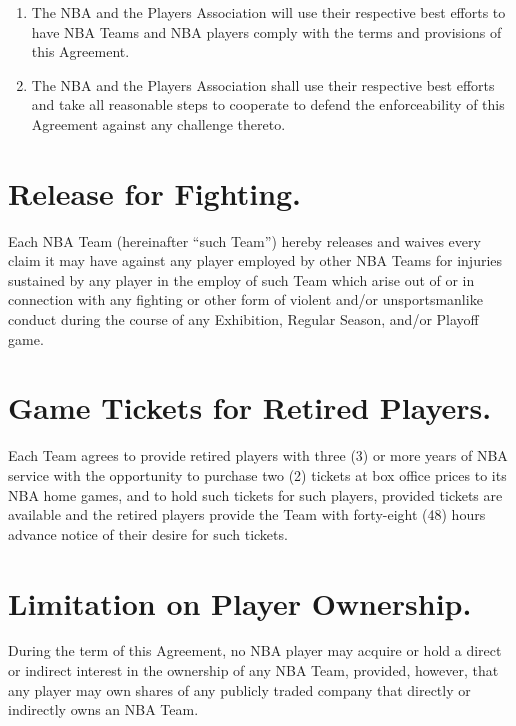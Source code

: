 \documentclass[
]{book}
\providecommand{\tightlist}{%
  \setlength{\itemsep}{0pt}\setlength{\parskip}{0pt}}
\begin{document}
\begin{enumerate}
\def\labelenumi{(\alph{enumi})}
\tightlist
\item
  The NBA and the Players Association will use their respective best efforts to have NBA Teams and NBA players comply with the terms and provisions of this Agreement.
\item
  The NBA and the Players Association shall use their respective best efforts and take all reasonable steps to cooperate to defend the enforceability of this Agreement against any challenge thereto.
\end{enumerate}

\hypertarget{release-for-fighting.}{%
\section{Release for Fighting.}\label{release-for-fighting.}}

Each NBA Team (hereinafter ``such Team'') hereby releases and waives every claim it may have against any player employed by other NBA Teams for injuries sustained by any player in the employ of such Team which arise out of or in connection with any fighting or other form of violent and/or unsportsmanlike conduct during the course of any Exhibition, Regular Season, and/or Playoff game.

\hypertarget{game-tickets-for-retired-players.}{%
\section{Game Tickets for Retired Players.}\label{game-tickets-for-retired-players.}}

Each Team agrees to provide retired players with three (3) or more years of NBA service with the opportunity to purchase two (2) tickets at box office prices to its NBA home games, and to hold such tickets for such players, provided tickets are available and the retired players provide the Team with forty-eight (48) hours advance notice of their desire for such tickets.

\hypertarget{limitation-on-player-ownership.}{%
\section{Limitation on Player Ownership.}\label{limitation-on-player-ownership.}}

During the term of this Agreement, no NBA player may acquire or hold a direct or indirect interest in the ownership of any NBA Team, provided, however, that any player may own shares of any publicly traded company that directly or indirectly owns an NBA Team.
\end{document}
